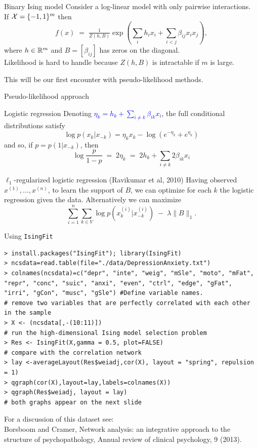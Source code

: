 \documentclass[11pt,handout,aspectratio=169,dvipsnames]{beamer}
\begin{document}
\begin{frame}{Binary Ising model}
	Consider a log-linear model with only pairwise interactions.\\[.3cm]
	If ${\cal X}=\{-1,1\}^m$ then $$f(x)\;=\;\tfrac{1}{Z(h,B)}\exp\left(\sum_i h_i x_i+\sum_{i<j}\beta_{ij}x_i x_j \right),$$
	where $h\in \mathbb R^m$ and $B=[\beta_{ij}]$ has zeros on the diagonal.\\[.3cm]
	Likelihood is hard to handle because $Z(h,B)$ is intractable if $m$ is large.\\
	\bigskip
	
	This will be our first encounter with pseudo-likelihood methods.
\end{frame}


\begin{frame}{Pseudo-likelihood approach}
\begin{alertblock}{Logistic regression}
Denoting \textcolor{blue}{$\eta_k=h_k+\sum_{i\neq k}\beta_{ik}x_i$}, the full conditional distributions satisfy
	$$
	\log p(x_k|x_{-k})=\eta_k x_k-\log(e^{-\eta_k}+e^{\eta_k })
	$$ 
	and so, if $p= p(1|x_{-k})$, then 
	$$
	\log \frac{p}{1-p}\;=\;2\eta_k\;=\;2h_k+\sum_{i\neq k}2\beta_{ik}x_i
	$$
\end{alertblock}
\begin{alertblock}{$\ell_1$-regularized logistic regression (Ravikumar et al, 2010)}
	Having observed $x^{(1)},\ldots,x^{(n)}$, to learn the support of $B$, we can optimize for each $k$ the logistic regression given the data. Alternatively we can maximize
	$$
	\sum_{i=1}^n \sum_{k\in V} \log p(x_k^{(i)}|x_{-k}^{(i)})\;-\;\lambda \|B\|_1.
	$$
\end{alertblock}
\end{frame}

\begin{frame}[fragile,label=DepAnx]{Using \texttt{IsingFit}}
	\begin{lstlisting}
> install.packages("IsingFit"); library(IsingFit)
> ncsdata=read.table(file="./data/DepressionAnxiety.txt") 
> colnames(ncsdata)=c("depr", "inte", "weig", "mSle", "moto", "mFat", "repr", "conc", "suic", "anxi", "even", "ctrl", "edge", "gFat", "irri", "gCon", "musc", "gSle") #Define variable names.
# remove two variables that are perfectly correlated with each other in the sample
> X <- (ncsdata[,-(10:11)])
# run the high-dimensional Ising model selection problem
> Res <- IsingFit(X,gamma = 0.5, plot=FALSE)
# compare with the correlation network
> lay <-averageLayout(Res$weiadj,cor(X), layout = "spring", repulsion = 1)
> qgraph(cor(X),layout=lay,labels=colnames(X))
> qgraph(Res$weiadj, layout = lay)
# both graphs appear on the next slide
\end{lstlisting}
For a discussion of this dataset see:\\[.2cm]
{\footnotesize Borsboom and Cramer, Network analysis: an integrative approach to the\\[-.2cm] structure of psychopathology, Annual review of clinical psychology, 9 (2013). }
\end{frame}
\end{document}
